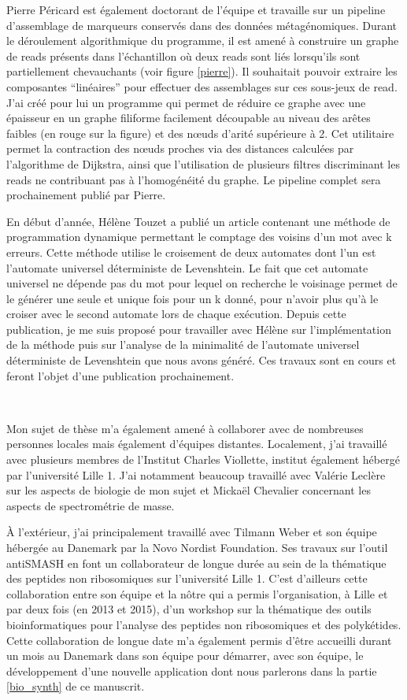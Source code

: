Pierre Péricard est également doctorant de l'équipe et travaille sur un pipeline d'assemblage de marqueurs conservés dans des données métagénomiques.
Durant le déroulement algorithmique du programme, il est amené à construire un graphe de reads présents dans l'échantillon où deux reads sont liés lorsqu'ils sont partiellement chevauchants (voir figure \ref{pierre}).
Il souhaitait pouvoir extraire les composantes ``linéaires'' pour effectuer des assemblages sur ces sous-jeux de read.
J'ai créé pour lui un programme qui permet de réduire ce graphe avec une épaisseur en un graphe filiforme facilement découpable au niveau des arêtes faibles (en rouge sur la figure) et des n\oe{}uds d'arité supérieure à 2.
Cet utilitaire permet la contraction des n\oe{}uds proches via des distances calculées par l'algorithme de Dijkstra, ainsi que l'utilisation de plusieurs filtres discriminant les reads ne contribuant pas à l'homogénéité du graphe.
Le pipeline complet sera prochainement publié par Pierre.

En début d'année, Hélène Touzet a publié un article contenant une méthode de programmation dynamique permettant le comptage des voisins d'un mot avec k erreurs.
Cette méthode utilise le croisement de deux automates dont l'un est l'automate universel déterministe de Levenshtein.
Le fait que cet automate universel ne dépende pas du mot pour lequel on recherche le voisinage permet de le générer une seule et unique fois pour un k donné, pour n'avoir plus qu'à le croiser avec le second automate lors de chaque exécution.
Depuis cette publication, je me suis proposé pour travailler avec Hélène sur l'implémentation de la méthode puis sur l'analyse de la minimalité de l'automate universel déterministe de Levenshtein que nous avons généré.
Ces travaux sont en cours et feront l'objet d'une publication prochainement.

~~

Mon sujet de thèse m'a également amené à collaborer avec de nombreuses personnes locales mais également d'équipes distantes.
Localement, j'ai travaillé avec plusieurs membres de l'Institut Charles Viollette, institut également hébergé par l'université Lille 1.
J'ai notamment beaucoup travaillé avec Valérie Leclère sur les aspects de biologie de mon sujet et Mickaël Chevalier concernant les aspects de spectrométrie de masse.

À l'extérieur, j'ai principalement travaillé avec Tilmann Weber et son équipe hébergée au Danemark par la Novo Nordist Foundation.
Ses travaux sur l'outil antiSMASH en font un collaborateur de longue durée au sein de la thématique des peptides non ribosomiques sur l'université Lille 1.
C'est d'ailleurs cette collaboration entre son équipe et la nôtre qui a permis l'organisation, à Lille et par deux fois (en 2013 et 2015), d'un workshop sur la thématique des outils bioinformatiques pour l'analyse des peptides non ribosomiques et des polykétides.
Cette collaboration de longue date m'a également permis d'être accueilli durant un mois au Danemark dans son équipe pour démarrer, avec son équipe, le développement d'une nouvelle application dont nous parlerons dans la partie \ref{bio_synth} de ce manuscrit.

